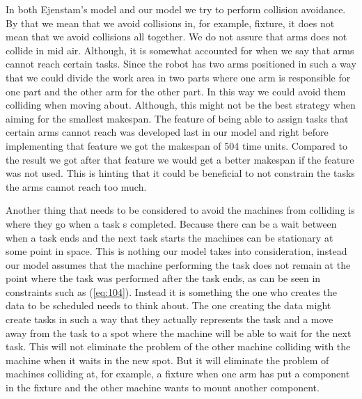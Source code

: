 In both Ejenstam's model and our model we try to perform collision avoidance. By that we mean that we avoid collisions in, for example, fixture, it does not mean that we avoid collisions all together. We do not assure that arms does not collide in mid air. Although, it is somewhat accounted for when we say that arms cannot reach certain tasks. Since the robot has two arms positioned in such a way that we could divide the work area in two parts where one arm is responsible for one part and the other arm for the other part. In this way we could avoid them colliding when moving about. Although, this might not be the best strategy when aiming for the smallest makespan. The feature of being able to assign tasks that certain arms cannot reach was developed last in our model and right before implementing that feature we got the makespan of 504 time units. Compared to the result we got after that feature we would get a better makespan if the feature was not used. This is hinting that it could be beneficial to not constrain the tasks the arms cannot reach too much.

Another thing that needs to be considered to avoid the machines from colliding is where they go when a task s completed. Because there can be a wait between when a task ends and the next task starts the machines can be stationary at some point in space. This is nothing our model takes into consideration, instead our model assumes that the machine performing the task does not remain at the point where the task was performed after the task ends, as can be seen in constraints such as (\ref{eq:104}). Instead it is something the one who creates the data to be scheduled needs to think about. The one creating the data might create tasks in such a way that they actually represents the task and a move away from the task to a spot where the machine will be able to wait for the next task. This will not eliminate the problem of the other machine colliding with the machine when it waits in the new spot. But it will eliminate the problem of machines colliding at, for example, a fixture when one arm has put a component in the fixture and the other machine wants to mount another component.

